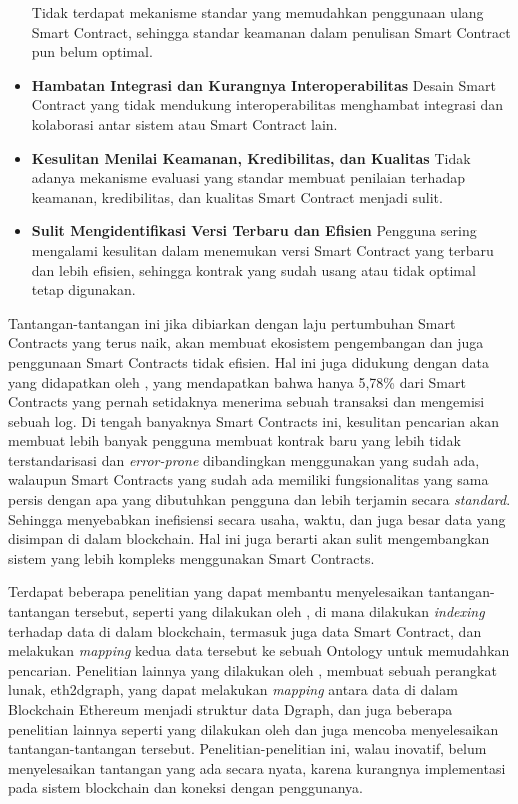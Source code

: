 \begin{itemize}
	      Tidak terdapat mekanisme standar yang memudahkan penggunaan ulang Smart Contract, sehingga standar keamanan dalam penulisan Smart Contract pun belum optimal.
	\item \textbf{Hambatan Integrasi dan Kurangnya Interoperabilitas} \newline
	      Desain Smart Contract yang tidak mendukung interoperabilitas menghambat integrasi dan kolaborasi antar sistem atau Smart Contract lain.
	\item \textbf{Kesulitan Menilai Keamanan, Kredibilitas, dan Kualitas} \newline
	      Tidak adanya mekanisme evaluasi yang standar membuat penilaian terhadap keamanan, kredibilitas, dan kualitas Smart Contract menjadi sulit.
	\item \textbf{Sulit Mengidentifikasi Versi Terbaru dan Efisien} \newline
	      Pengguna sering mengalami kesulitan dalam menemukan versi Smart Contract yang terbaru dan lebih efisien, sehingga kontrak yang sudah usang atau tidak optimal tetap digunakan.
\end{itemize}

Tantangan-tantangan ini jika dibiarkan dengan laju pertumbuhan Smart Contracts yang terus naik, akan membuat ekosistem pengembangan dan juga penggunaan Smart Contracts tidak efisien. Hal ini juga didukung dengan data yang didapatkan oleh \cite{aimar2023extraction}, yang mendapatkan bahwa hanya 5,78\% dari Smart Contracts yang pernah setidaknya menerima sebuah transaksi dan mengemisi sebuah log. Di tengah banyaknya Smart Contracts ini, kesulitan pencarian akan membuat lebih banyak pengguna membuat kontrak baru yang lebih tidak terstandarisasi dan \textit{error-prone} dibandingkan menggunakan yang sudah ada, walaupun Smart Contracts yang sudah ada memiliki fungsionalitas yang sama persis dengan apa yang dibutuhkan pengguna dan lebih terjamin secara \textit{standard}. Sehingga menyebabkan inefisiensi secara usaha, waktu, dan juga besar data yang disimpan di dalam blockchain. Hal ini juga berarti akan sulit mengembangkan sistem yang lebih kompleks menggunakan Smart Contracts.

Terdapat beberapa penelitian yang dapat membantu menyelesaikan tantangan-tantangan tersebut, seperti yang dilakukan oleh \cite{third2017linked}, di mana dilakukan \textit{indexing} terhadap data di dalam blockchain, termasuk juga data Smart Contract, dan melakukan \textit{mapping} kedua data tersebut ke sebuah Ontology untuk memudahkan pencarian. Penelitian lainnya yang dilakukan oleh \cite{aimar2023extraction}, membuat sebuah perangkat lunak, eth2dgraph, yang dapat melakukan \textit{mapping} antara data di dalam Blockchain Ethereum menjadi struktur data Dgraph, dan juga beberapa penelitian lainnya seperti yang dilakukan oleh \cite{baqa2019semantic} dan \cite{cano2021toward} juga mencoba menyelesaikan tantangan-tantangan tersebut. Penelitian-penelitian ini, walau inovatif, belum menyelesaikan tantangan yang ada secara nyata, karena kurangnya implementasi pada sistem blockchain dan koneksi dengan penggunanya.

